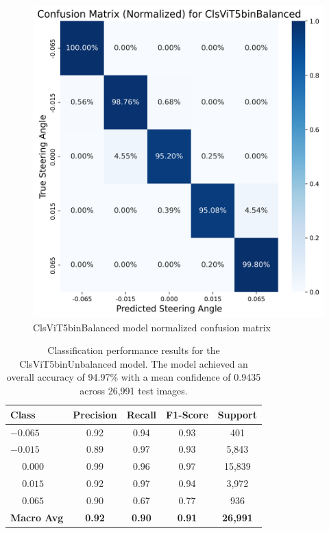 \begin{figure}[H]
\centering
\includegraphics[width=0.65\linewidth]{Figures/Results/cm_norm_ClsViT5binBalanced.png}
\caption{ClsViT5binBalanced model normalized confusion matrix}
\label{fig:cm_norm_ClsViT5binBalanced}
\end{figure}


\begin{table}[htbp]
\centering
\begin{tabular}{@{}lcccc@{}}
\toprule
\textbf{Class} & \textbf{Precision} & \textbf{Recall} & \textbf{F1-Score} & \textbf{Support} \\
\midrule
$-0.065$ & 0.92 & 0.94 & 0.93 & 401 \\
$-0.015$ & 0.89 & 0.97 & 0.93 & 5,843 \\
$\phantom{-}0.000$ & 0.99 & 0.96 & 0.97 & 15,839 \\
$\phantom{-}0.015$ & 0.92 & 0.97 & 0.94 & 3,972 \\
$\phantom{-}0.065$ & 0.90 & 0.67 & 0.77 & 936 \\
\midrule
\textbf{Macro Avg} & \textbf{0.92} & \textbf{0.90} & \textbf{0.91} & \textbf{26,991} \\
\bottomrule
\end{tabular}
\caption{Classification performance results for the ClsViT5binUnbalanced model. The model achieved an overall accuracy of 94.97\% with a mean confidence of 0.9435 across 26,991 test images.}
\label{tab:clf_report_ClsViT5binUnbalanced}
\end{table}


